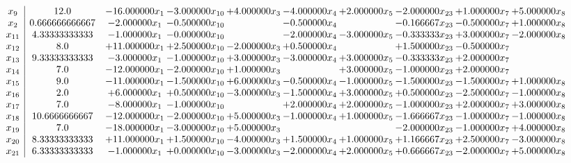 \documentclass[10pt]{article}
\begin{document}
 \[\begin{array}{c| c c@{\hskip 2pt} c@{\hskip 2pt} c@{\hskip 2pt} c@{\hskip 2pt} c@{\hskip 2pt} c@{\hskip 2pt} c@{\hskip 2pt} c@{\hskip 2pt} }
 x_{9}   &  12.0 & -16.000000 x_{1} & -3.000000 x_{10} & + 4.000000 x_{3} & -4.000000 x_{4} & + 2.000000 x_{5} & -2.000000 x_{23} & + 1.000000 x_{7} & + 5.000000 x_{8}\\
 x_{2}   &  0.666666666667 & -2.000000 x_{1} & -0.500000 x_{10} &   & -0.500000 x_{4} &   & -0.166667 x_{23} & -0.500000 x_{7} & + 1.000000 x_{8}\\
 x_{11}   &  4.33333333333 & -1.000000 x_{1} & -0.000000 x_{10} &   & -2.000000 x_{4} & -3.000000 x_{5} & -0.333333 x_{23} & + 3.000000 x_{7} & -2.000000 x_{8}\\
 x_{12}   &  8.0 & + 11.000000 x_{1} & + 2.500000 x_{10} & -2.000000 x_{3} & + 0.500000 x_{4} &   & + 1.500000 x_{23} & -0.500000 x_{7} &   \\
 x_{13}   &  9.33333333333 & -3.000000 x_{1} & -1.000000 x_{10} & + 3.000000 x_{3} & -3.000000 x_{4} & + 3.000000 x_{5} & -0.333333 x_{23} & + 2.000000 x_{7} &   \\
 x_{14}   &  7.0 & -12.000000 x_{1} & -2.000000 x_{10} & + 1.000000 x_{3} &   & + 3.000000 x_{5} & -1.000000 x_{23} & + 2.000000 x_{7} &   \\
 x_{15}   &  9.0 & -11.000000 x_{1} & -1.500000 x_{10} & + 6.000000 x_{3} & -0.500000 x_{4} & -1.000000 x_{5} & -1.500000 x_{23} & -1.500000 x_{7} & + 1.000000 x_{8}\\
 x_{16}   &  2.0 & + 6.000000 x_{1} & + 0.500000 x_{10} & -3.000000 x_{3} & -1.500000 x_{4} & + 3.000000 x_{5} & + 0.500000 x_{23} & -2.500000 x_{7} & -1.000000 x_{8}\\
 x_{17}   &  7.0 & -8.000000 x_{1} & -1.000000 x_{10} &   & + 2.000000 x_{4} & + 2.000000 x_{5} & -1.000000 x_{23} & + 2.000000 x_{7} & + 3.000000 x_{8}\\
 x_{18}   &  10.6666666667 & -12.000000 x_{1} & -2.000000 x_{10} & + 5.000000 x_{3} & -1.000000 x_{4} & + 1.000000 x_{5} & -1.666667 x_{23} & -1.000000 x_{7} & -1.000000 x_{8}\\
 x_{19}   &  7.0 & -18.000000 x_{1} & -3.000000 x_{10} & + 5.000000 x_{3} &    &   & -2.000000 x_{23} & -1.000000 x_{7} & + 4.000000 x_{8}\\
 x_{20}   &  8.33333333333 & + 11.000000 x_{1} & + 1.500000 x_{10} & -4.000000 x_{3} & + 1.500000 x_{4} & + 1.000000 x_{5} & + 1.166667 x_{23} & + 2.500000 x_{7} & -3.000000 x_{8}\\
 x_{21}   &  6.33333333333 & -1.000000 x_{1} & + 0.000000 x_{10} & -3.000000 x_{3} & -2.000000 x_{4} & + 2.000000 x_{5} & + 0.666667 x_{23} & -2.000000 x_{7} & + 5.000000 x_{8}\\

\end{array}\]
\end{document}
